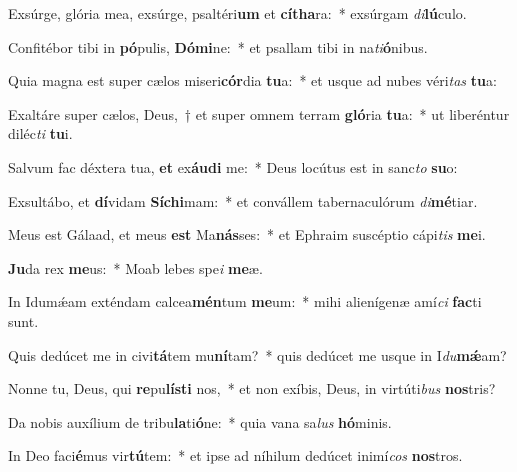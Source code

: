 \item Exsúrge, glória mea, exsúrge, psaltéri\textbf{um} et \textbf{cí}\textbf{tha}ra:~* exsúrgam \textit{di}\textbf{lú}culo.
\item Confitébor tibi in \textbf{pó}pulis, \textbf{Dó}\textbf{mi}ne:~* et psallam tibi in na\textit{ti}\textbf{ó}nibus.
\item Quia magna est super cælos miseri\textbf{cór}dia \textbf{tu}a:~* et usque ad nubes véri\textit{tas} \textbf{tu}a:
\item Exaltáre super cælos, Deus,~† et super omnem terram \textbf{gló}ria \textbf{tu}a:~* ut liberéntur diléc\textit{ti} \textbf{tu}i.
\item Salvum fac déxtera tua, \textbf{et} ex\textbf{áu}\textbf{di} me:~* Deus locútus est in sanc\textit{to} \textbf{su}o:
\item Exsultábo, et \textbf{dí}vidam \textbf{Sí}\textbf{chi}mam:~* et convállem tabernaculórum \textit{di}\textbf{mé}tiar.
\item Meus est Gálaad, et meus \textbf{est} Ma\textbf{nás}ses:~* et Ephraim suscéptio cápi\textit{tis} \textbf{me}i.
\item \textbf{Ju}da rex \textbf{me}us:~* Moab lebes spe\textit{i} \textbf{me}æ.
\item In Idumǽam exténdam calcea\textbf{mén}tum \textbf{me}um:~* mihi alienígenæ amí\textit{ci} \textbf{fac}ti sunt.
\item Quis dedúcet me in civi\textbf{tá}tem mu\textbf{ní}tam?~* quis dedúcet me usque in I\textit{du}\textbf{mǽ}am?
\item Nonne tu, Deus, qui \textbf{re}pu\textbf{lís}\textbf{ti} nos,~* et non exíbis, Deus, in virtúti\textit{bus} \textbf{nos}tris?
\item Da nobis auxílium de tribu\textbf{la}ti\textbf{ó}ne:~* quia vana sa\textit{lus} \textbf{hó}minis.
\item In Deo faci\textbf{é}mus vir\textbf{tú}tem:~* et ipse ad níhilum dedúcet inimí\textit{cos} \textbf{nos}tros.

